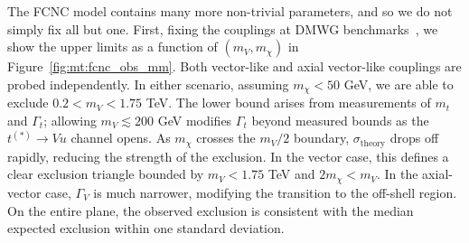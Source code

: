 The FCNC model contains many more non-trivial parameters, and so we do not simply fix all but one.
First, fixing the couplings at DMWG benchmarks~\cite{lhcdmwg}, we show the upper limits as a function of $(m_V,m_\chi)$ in Figure~\ref{fig:mt:fcnc_obs_mm}.
Both vector-like and axial vector-like couplings are probed independently. 
In either scenario, assuming $m_\chi < 50$ GeV, we are able to exclude $0.2 < m_V < 1.75$ TeV.
The lower bound arises from measurements of $m_t$ and $\Gamma_t$; allowing $m_V \lesssim 200$ GeV modifies $\Gamma_t$ beyond measured bounds as the $t^{(*)} \rightarrow V u$ channel opens. 
As $m_\chi$ crosses the $m_V/2$ boundary, $\sigma_\mathrm{theory}$ drops off rapidly, reducing the strength of the exclusion.
In the vector case, this defines a clear exclusion triangle bounded by $m_V < 1.75$ TeV and $2m_\chi < m_V$.
In the axial-vector case, $\Gamma_V$ is much narrower, modifying the transition to the off-shell region. 
On the entire plane, the observed exclusion is consistent with the median expected exclusion within one standard deviation. 

